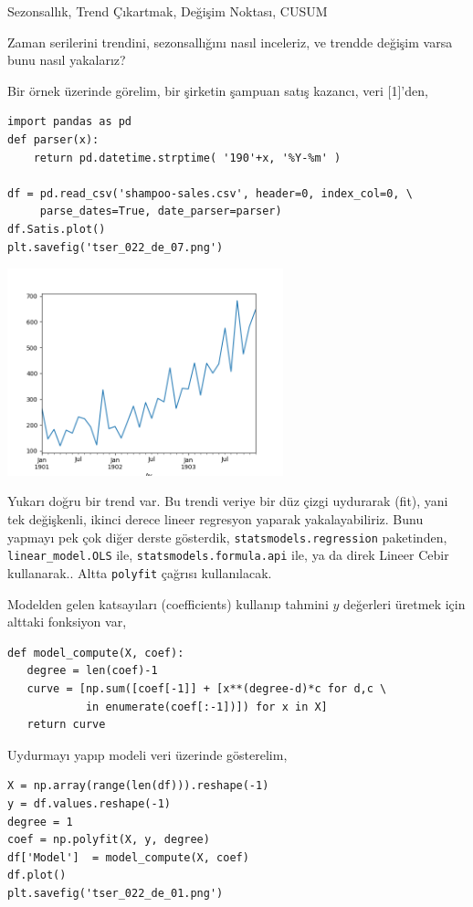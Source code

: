 \documentclass[12pt,fleqn]{article}\usepackage{../../common}
\begin{document}
Sezonsallık, Trend Çıkartmak, Değişim Noktası, CUSUM

Zaman serilerini trendini, sezonsallığını nasıl inceleriz, ve trendde değişim
varsa bunu nasıl yakalarız?

Bir örnek üzerinde görelim, bir şirketin şampuan satış kazancı, veri [1]'den,

\begin{verbatim}
import pandas as pd
def parser(x):
    return pd.datetime.strptime( '190'+x, '%Y-%m' )
    
df = pd.read_csv('shampoo-sales.csv', header=0, index_col=0, \
     parse_dates=True, date_parser=parser)
df.Satis.plot()
plt.savefig('tser_022_de_07.png')
\end{verbatim}

\includegraphics[height=6cm]{tser_022_de_07.png}

Yukarı doğru bir trend var. Bu trendi veriye bir düz çizgi uydurarak (fit), yani
tek değişkenli, ikinci derece lineer regresyon yaparak yakalayabiliriz. Bunu
yapmayı pek çok diğer derste gösterdik, \verb!statsmodels.regression!
paketinden, \verb!linear_model.OLS! ile, \verb!statsmodels.formula.api! ile,
ya da direk Lineer Cebir kullanarak.. Altta \verb!polyfit!  çağrısı
kullanılacak.

Modelden gelen katsayıları (coefficients) kullanıp tahmini $y$ değerleri üretmek
için alttaki fonksiyon var,

\begin{verbatim}
def model_compute(X, coef):
   degree = len(coef)-1
   curve = [np.sum([coef[-1]] + [x**(degree-d)*c for d,c \
            in enumerate(coef[:-1])]) for x in X]
   return curve
\end{verbatim}

Uydurmayı yapıp modeli veri üzerinde gösterelim,

\begin{verbatim}
X = np.array(range(len(df))).reshape(-1)
y = df.values.reshape(-1)
degree = 1
coef = np.polyfit(X, y, degree)
df['Model']  = model_compute(X, coef)
df.plot()
plt.savefig('tser_022_de_01.png')
\end{verbatim}
\end{document}

